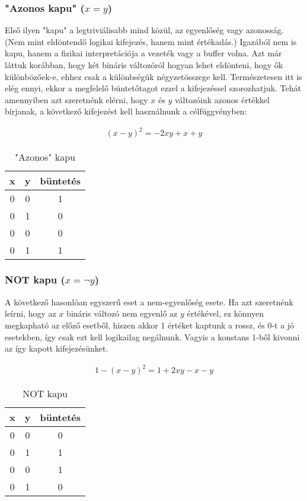\subsubsection{"Azonos kapu" ($x=y$)}


Első ilyen "kapu" a legtriviálisabb mind közül, az egyenlőség vagy azonosság. (Nem mint eldöntendő logikai kifejezés, hanem mint értékadás.) Igazából nem is kapu, hanem a fizikai interpretációja a vezeték vagy a buffer volna. Azt már láttuk korábban, hogy két bináris változóról hogyan lehet eldönteni, hogy ők különbözőek-e, ehhez csak a különbségük négyzetösszege kell. Természetesen itt is elég ennyi, ekkor a megfelelő büntetőtagot ezzel a kifejezéssel szorozhatjuk. Tehát amennyiben azt szeretnénk elérni, hogy $x$ és $y$ változóink azonos értékkel bírjanak, a következő kifejezést kell használnunk a célfüggvényben:

\begin{align}
	(x-y)^2=-2xy+x+y
\end{align}

\begin{table}[ht]
	\footnotesize
	\centering
	\begin{tabular}{ c c c }
		\toprule
		x & y & büntetés \\
		\midrule
		0 & 0 & 1 \\
		0 & 1 & 0 \\
		0 & 0 & 0 \\
		0 & 1 & 1 \\		
		\bottomrule
	\end{tabular}
	\caption{"Azonos" kapu}
	\label{tab:SAMEgate}
\end{table}

\subsubsection{NOT kapu ($x= \neg y$)}

A következő hasonlóan egyszerű eset a nem-egyenlőség esete. Ha azt szeretnénk leírni, hogy az $x$ bináris változó nem egyenlő az $y$ értékével, ez könnyen megkapható az előző esetből, hiszen akkor 1 értéket kaptunk a rossz, és 0-t a jó esetekben, így csak ezt kell logikailag negálnunk. Vagyis a konstans 1-ből kivonni az így kapott kifejezésünket.



\begin{align}
	1-(x-y)^2=1+2xy-x-y
\end{align}

\begin{table}[ht]
	\footnotesize
	\centering
	\begin{tabular}{ c c c }
		\toprule
		x & y & büntetés \\
		\midrule
		0 & 0 & 0 \\
		0 & 1 & 1 \\
		0 & 0 & 1 \\
		0 & 1 & 0 \\		
		\bottomrule
	\end{tabular}
	\caption{NOT kapu}
	\label{tab:NOTgate}
\end{table}

